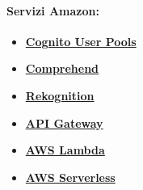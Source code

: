 	\paragraph{\textbf{Servizi Amazon:}} 
\begin{itemize}
	\item
	\href {https://docs.aws.amazon.com/cognito/latest/developerguide/cognito-user-identity-pools.html}{\textbf{Cognito User Pools}}
	\item
	\href{https://docs.aws.amazon.com/comprehend/latest/dg/what-is.html}{\textbf{Comprehend}}
	\item 
	\href{https://docs.aws.amazon.com/rekognition/latest/dg/what-is.html}{\textbf{Rekognition}}
	\item 
	\href{https://docs.aws.amazon.com/apigateway/latest/developerguide/welcome.html}{\textbf{API Gateway}}
	\item
	\href{https://docs.aws.amazon.com/lambda/latest/dg/welcome.html}{\textbf{AWS Lambda}}
	\item 
	\href{https://docs.aws.amazon.com/serverless-application-model/latest/developerguide/what-is-sam.html}{\textbf{AWS Serverless}}
\end{itemize}